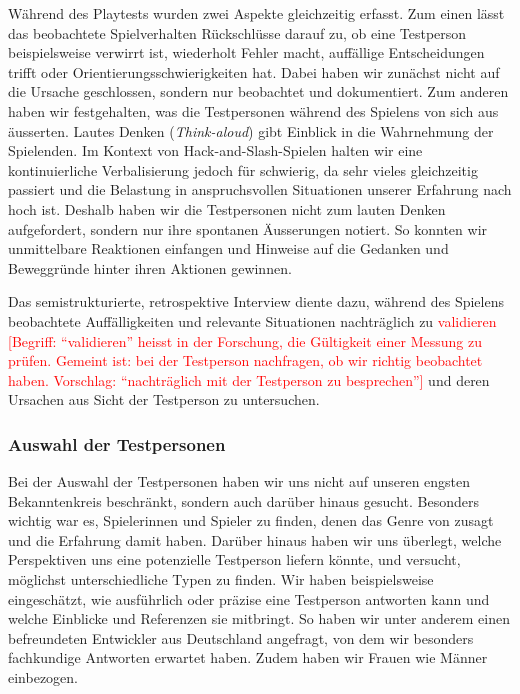 \documentclass[../Main.tex]{subfiles}
\begin{document}
Während des Playtests wurden zwei Aspekte gleichzeitig erfasst. Zum einen lässt das beobachtete Spielverhalten Rückschlüsse darauf zu, ob eine Testperson beispielsweise verwirrt ist, wiederholt Fehler macht, auffällige Entscheidungen trifft oder Orientierungsschwierigkeiten hat. Dabei haben wir zunächst nicht auf die Ursache geschlossen, sondern nur beobachtet und dokumentiert. Zum anderen haben wir festgehalten, was die Testpersonen während des Spielens von sich aus äusserten. Lautes Denken (\textit{Think-aloud}) gibt Einblick in die Wahrnehmung der Spielenden.\autocite[189--190]{drachen2018gamesuserresearch} Im Kontext von Hack-and-Slash-Spielen halten wir eine kontinuierliche Verbalisierung jedoch für schwierig, da sehr vieles gleichzeitig passiert und die Belastung in anspruchsvollen Situationen unserer Erfahrung nach hoch ist. Deshalb haben wir die Testpersonen nicht zum lauten Denken aufgefordert, sondern nur ihre spontanen Äusserungen notiert. So konnten wir unmittelbare Reaktionen einfangen und Hinweise auf die Gedanken und Beweggründe hinter ihren Aktionen gewinnen.

Das semistrukturierte, retrospektive Interview diente dazu, während des Spielens beobachtete Auffälligkeiten und relevante Situationen nachträglich zu \textcolor{red}{validieren [Begriff: \enquote{validieren} heisst in der Forschung, die Gültigkeit einer Messung zu prüfen. Gemeint ist: bei der Testperson nachfragen, ob wir richtig beobachtet haben. Vorschlag: \enquote{nachträglich mit der Testperson zu besprechen}]} und deren Ursachen aus Sicht der Testperson zu untersuchen.\autocite[164--167]{drachen2018gamesuserresearch}

\subsubsection{Auswahl der Testpersonen} \label{sec:AuswahlTP}
Bei der Auswahl der Testpersonen haben wir uns nicht auf unseren engsten Bekanntenkreis beschränkt, sondern auch darüber hinaus gesucht. Besonders wichtig war es, Spielerinnen und Spieler zu finden, denen das Genre von  zusagt und die Erfahrung damit haben. Darüber hinaus haben wir uns überlegt, welche Perspektiven uns eine potenzielle Testperson liefern könnte, und versucht, möglichst unterschiedliche Typen zu finden. Wir haben beispielsweise eingeschätzt, wie ausführlich oder präzise eine Testperson antworten kann und welche Einblicke und Referenzen sie mitbringt. So haben wir unter anderem einen befreundeten Entwickler aus Deutschland angefragt, von dem wir besonders fachkundige Antworten erwartet haben. Zudem haben wir Frauen wie Männer einbezogen.
\end{document}

